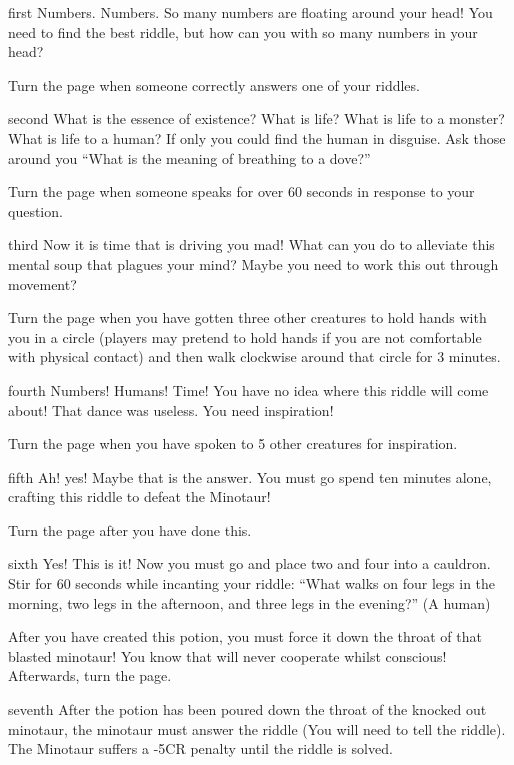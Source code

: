 \documentclass[notebook]{guildcamp2} %
\begin{document}
\startnotebook{\nriddletastic{}}

\begin{page}{first}
Numbers. Numbers. So many numbers are floating around your head! You need to find the best riddle, but how can you with so many numbers in your head? 

Turn the page when someone correctly answers one of your riddles.
\end{page}

\begin{page}{second}
What is the essence of existence? What is life? What is life to a monster? What is life to a human? If only you could find the human in disguise. Ask those around you ``What is the meaning of breathing to a dove?''

Turn the page when someone speaks for over 60 seconds in response to your question.
\end{page}

\begin{page}{third}
Now it is time that is driving you mad! What can you do to alleviate this mental soup that plagues your mind? Maybe you need to work this out through movement?

Turn the page when you have gotten three other creatures to hold hands with you in a circle (players may pretend to hold hands if you are not comfortable with physical contact) and then walk clockwise around that circle for 3 minutes. 

\end{page}
\begin{page}{fourth}
Numbers! Humans! Time! You have no idea where this riddle will come about! That dance was useless. You need inspiration! 

Turn the page when you have spoken to 5 other creatures for inspiration.
\end{page}

\begin{page}{fifth}
Ah! yes! Maybe that is the answer. You must go spend ten minutes alone, crafting this riddle to defeat the Minotaur!

Turn the page after you have done this.
\end{page}

\begin{page}{sixth}
Yes! This is it! Now you must go and place two \iBilberries{} and four \iEyebright{} into a cauldron. Stir for 60 seconds while incanting your riddle: ``What walks on four legs in the morning, two legs in the afternoon, and three legs in the evening?'' (A human)

After you have created this potion, you must force it down the throat of that blasted minotaur! You know that \cMinotaur{} will never cooperate whilst conscious! Afterwards, turn the page.
\end{page}

\begin{page}{seventh}
After the potion has been poured down the throat of the knocked out minotaur, the minotaur must answer the riddle (You will need to tell \cMinotaur{\them} the riddle). The Minotaur suffers a -5CR penalty until the riddle is solved. 
\end{page}


\endnotebook
\end{document}
